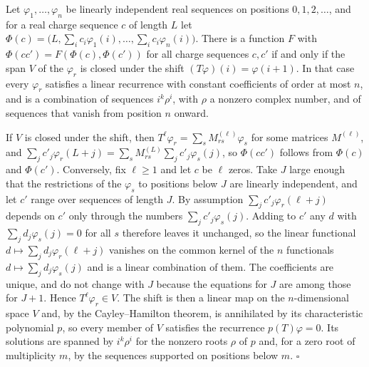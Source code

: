 Let $\varphi_1,\dots,\varphi_n$ be linearly independent real sequences on positions $0,1,2,\dots$, and for a real charge sequence $c$ of length $L$ let $\Phi(c)=\bigl(L,\sum_i c_i\varphi_1(i),\dots,\sum_i c_i\varphi_n(i)\bigr)$. There is a function $F$ with $\Phi(cc')=F(\Phi(c),\Phi(c'))$ for all charge sequences $c,c'$ if and only if the span $V$ of the $\varphi_r$ is closed under the shift $(T\varphi)(i)=\varphi(i+1)$. In that case every $\varphi_r$ satisfies a linear recurrence with constant coefficients of order at most $n$, and is a combination of sequences $i^k\rho^i$, with $\rho$ a nonzero complex number, and of sequences that vanish from position $n$ onward.

\proofhead If $V$ is closed under the shift, then $T^{\ell}\varphi_r=\sum_s M^{(\ell)}_{rs}\varphi_s$ for some matrices $M^{(\ell)}$, and $\sum_j c'_j\varphi_r(L+j)=\sum_s M^{(L)}_{rs}\sum_j c'_j\varphi_s(j)$, so $\Phi(cc')$ follows from $\Phi(c)$ and $\Phi(c')$. Conversely, fix $\ell\geq1$ and let $c$ be $\ell$ zeros. Take $J$ large enough that the restrictions of the $\varphi_s$ to positions below $J$ are linearly independent, and let $c'$ range over sequences of length $J$. By assumption $\sum_j c'_j\varphi_r(\ell+j)$ depends on $c'$ only through the numbers $\sum_j c'_j\varphi_s(j)$. Adding to $c'$ any $d$ with $\sum_j d_j\varphi_s(j)=0$ for all $s$ therefore leaves it unchanged, so the linear functional $d\mapsto\sum_j d_j\varphi_r(\ell+j)$ vanishes on the common kernel of the $n$ functionals $d\mapsto\sum_j d_j\varphi_s(j)$ and is a linear combination of them. The coefficients are unique, and do not change with $J$ because the equations for $J$ are among those for $J+1$. Hence $T^{\ell}\varphi_r\in V$. The shift is then a linear map on the $n$-dimensional space $V$ and, by the Cayley--Hamilton theorem, is annihilated by its characteristic polynomial $p$, so every member of $V$ satisfies the recurrence $p(T)\varphi=0$. Its solutions are spanned by $i^k\rho^i$ for the nonzero roots $\rho$ of $p$ and, for a zero root of multiplicity $m$, by the sequences supported on positions below $m$. \hfill$\square$

